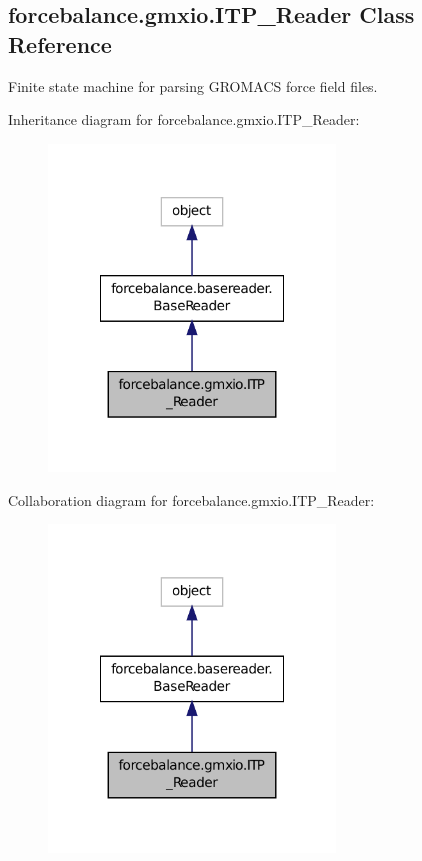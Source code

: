 \hypertarget{classforcebalance_1_1gmxio_1_1ITP__Reader}{\subsection{forcebalance.\-gmxio.\-I\-T\-P\-\_\-\-Reader Class Reference}
\label{classforcebalance_1_1gmxio_1_1ITP__Reader}
}


Finite state machine for parsing G\-R\-O\-M\-A\-C\-S force field files.  




Inheritance diagram for forcebalance.\-gmxio.\-I\-T\-P\-\_\-\-Reader\-:\nopagebreak
\begin{figure}[H]
\begin{center}
\leavevmode
\includegraphics[width=216pt]{classforcebalance_1_1gmxio_1_1ITP__Reader__inherit__graph}
\end{center}
\end{figure}


Collaboration diagram for forcebalance.\-gmxio.\-I\-T\-P\-\_\-\-Reader\-:\nopagebreak
\begin{figure}[H]
\begin{center}
\leavevmode
\includegraphics[width=216pt]{classforcebalance_1_1gmxio_1_1ITP__Reader__coll__graph}
\end{center}
\end{figure}
